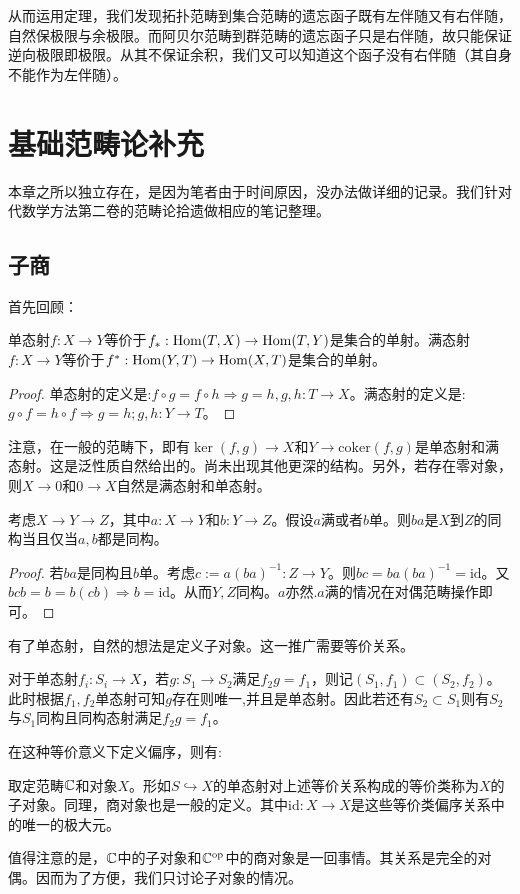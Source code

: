       从而运用定理，我们发现拓扑范畴到集合范畴的遗忘函子既有左伴随又有右伴随，自然保极限与余极限。而阿贝尔范畴到群范畴的遗忘函子只是右伴随，故只能保证逆向极限即极限。从其不保证余积，我们又可以知道这个函子没有右伴随（其自身不能作为左伴随）。

      
      \section{基础范畴论补充}
      本章之所以独立存在，是因为笔者由于时间原因，没办法做详细的记录。我们针对代数学方法第二卷的范畴论拾遗做相应的笔记整理。
      \subsection{子商}
      首先回顾：
      \begin{proposition}{}
        单态射$f:X \to Y$等价于$f_*:\mathrm{Hom}(T,X) \to \mathrm{Hom}(T,Y)$是集合的单射。满态射$f:X \to Y$等价于$f^*:\mathrm{Hom}(Y,T) \to \mathrm{Hom}(X,T)$是集合的单射。
      \end{proposition}
      \begin{proof}
        单态射的定义是:$f\circ g=f\circ h\Rightarrow g=h,g,h:T \to X$。满态射的定义是:$g \circ f=h \circ f \Rightarrow g=h;g,h: Y \to T$。
      \end{proof}
      注意，在一般的范畴下，即有$\ker(f,g) \to X$和$Y \to \mathrm{coker}(f,g)$是单态射和满态射。这是泛性质自然给出的。尚未出现其他更深的结构。另外，若存在零对象，则$X \to 0$和$0 \to X$自然是满态射和单态射。

     \begin{proposition}{}
        考虑$X \to Y \to Z$，其中$a:X \to Y$和$b:Y \to Z$。假设$a$满或者$b$单。则$ba$是$X$到$Z$的同构当且仅当$a,b$都是同构。
     \end{proposition}
     \begin{proof}
        若$ba$是同构且$b$单。考虑$c:=a(ba)^{-1}:Z \to Y$。则$bc=ba(ba)^{-1}=\mathrm{id}$。又$bcb=b=b(cb) \Rightarrow b=\mathrm{id}$。从而$Y,Z$同构。$a$亦然.$a$满的情况在对偶范畴操作即可。
     \end{proof}

     有了单态射，自然的想法是定义子对象。这一推广需要等价关系。
     
     对于单态射$f_i:S_i \to X$，若$g:S_1 \to S_2$满足$f_2g=f_1$，则记$(S_1,f_1)\subset (S_2,f_2)$。此时根据$f_1,f_2$单态射可知$g$存在则唯一,并且是单态射。因此若还有$S_2\subset S_1$则有$S_2$与$S_1$同构且同构态射满足$f_2g=f_1$。

     在这种等价意义下定义偏序，则有:
     \begin{definition}{}
        取定范畴$\mathbb{C}$和对象$X$。形如$S \hookrightarrow X$的单态射对上述等价关系构成的等价类称为$X$的子对象。同理，商对象也是一般的定义。其中$\mathrm{id}:X \to X$是这些等价类偏序关系中的唯一的极大元。
     \end{definition}
     值得注意的是，$\mathbb{C}$中的子对象和$\mathbb{C}^{\mathrm{op}}$中的商对象是一回事情。其关系是完全的对偶。因而为了方便，我们只讨论子对象的情况。

